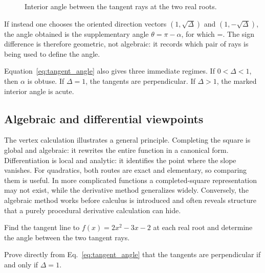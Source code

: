 \begin{figure}[htbp]
\centering
{}
\caption{Interior angle between the tangent rays at the two real roots.}
\end{figure}

If instead one chooses the oriented direction vectors $(1,\sqrt{\Delta})$ and $(1,-\sqrt{\Delta})$, the angle obtained is the supplementary angle $\theta=\pi-\alpha$, for which
\be
\cos\theta=.
\ee
The sign difference is therefore geometric, not algebraic: it records which pair of rays is being used to define the angle.

Equation~\eqref{eq:tangent_angle} also gives three immediate regimes. If $0<\Delta<1$, then $\alpha$ is obtuse. If $\Delta=1$, the tangents are perpendicular. If $\Delta>1$, the marked interior angle is acute.

\subsection{Algebraic and differential viewpoints}

The vertex calculation illustrates a general principle. Completing the square is global and algebraic: it rewrites the entire function in a canonical form. Differentiation is local and analytic: it identifies the point where the slope vanishes. For quadratics, both routes are exact and elementary, so comparing them is useful. In more complicated functions a completed-square representation may not exist, while the derivative method generalizes widely. Conversely, the algebraic method works before calculus is introduced and often reveals structure that a purely procedural derivative calculation can hide.

\begin{exercise}
Find the tangent line to $f(x)=2x^2-3x-2$ at each real root and determine the angle between the two tangent rays.
\end{exercise}

\begin{exercise}
Prove directly from Eq.~\eqref{eq:tangent_angle} that the tangents are perpendicular if and only if $\Delta=1$.
\end{exercise}

